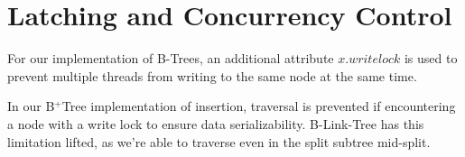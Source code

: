 \section{Latching and Concurrency Control}

For our implementation of B-Trees, an additional attribute $x.writelock$ is used to prevent multiple threads from writing to the same node at the same time.

In our B$^+$Tree implementation of insertion, traversal is prevented if encountering a node with a write lock to ensure data serializability. B-Link-Tree has this limitation lifted, as we're able to traverse even in the split subtree mid-split.
